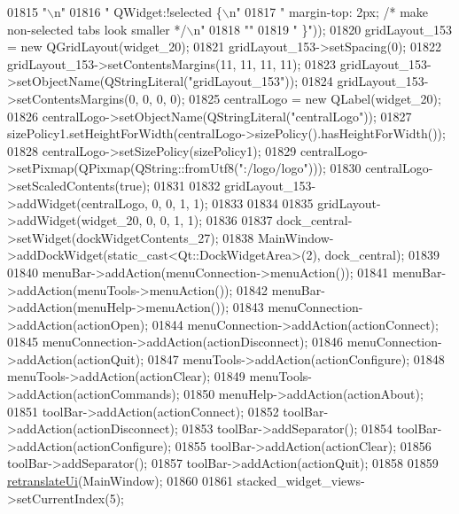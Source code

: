 \begin{DoxyCode}
01815 \textcolor{stringliteral}{"\(\backslash\)n"}
01816 \textcolor{stringliteral}{" QWidget:!selected \{\(\backslash\)n"}
01817 \textcolor{stringliteral}{"     margin-top: 2px; /* make non-selected tabs look smaller */\(\backslash\)n"}
01818 \textcolor{stringliteral}{""}
01819                         \textcolor{stringliteral}{" \}"}));
01820         gridLayout\_153 = \textcolor{keyword}{new} QGridLayout(widget\_20);
01821         gridLayout\_153->setSpacing(0);
01822         gridLayout\_153->setContentsMargins(11, 11, 11, 11);
01823         gridLayout\_153->setObjectName(QStringLiteral(\textcolor{stringliteral}{"gridLayout\_153"}));
01824         gridLayout\_153->setContentsMargins(0, 0, 0, 0);
01825         centralLogo = \textcolor{keyword}{new} QLabel(widget\_20);
01826         centralLogo->setObjectName(QStringLiteral(\textcolor{stringliteral}{"centralLogo"}));
01827         sizePolicy1.setHeightForWidth(centralLogo->sizePolicy().hasHeightForWidth());
01828         centralLogo->setSizePolicy(sizePolicy1);
01829         centralLogo->setPixmap(QPixmap(QString::fromUtf8(\textcolor{stringliteral}{":/logo/logo"})));
01830         centralLogo->setScaledContents(\textcolor{keyword}{true});
01831 
01832         gridLayout\_153->addWidget(centralLogo, 0, 0, 1, 1);
01833 
01834 
01835         gridLayout->addWidget(widget\_20, 0, 0, 1, 1);
01836 
01837         dock\_central->setWidget(dockWidgetContents\_27);
01838         MainWindow->addDockWidget(static\_cast<Qt::DockWidgetArea>(2), dock\_central);
01839 
01840         menuBar->addAction(menuConnection->menuAction());
01841         menuBar->addAction(menuTools->menuAction());
01842         menuBar->addAction(menuHelp->menuAction());
01843         menuConnection->addAction(actionOpen);
01844         menuConnection->addAction(actionConnect);
01845         menuConnection->addAction(actionDisconnect);
01846         menuConnection->addAction(actionQuit);
01847         menuTools->addAction(actionConfigure);
01848         menuTools->addAction(actionClear);
01849         menuTools->addAction(actionCommands);
01850         menuHelp->addAction(actionAbout);
01851         toolBar->addAction(actionConnect);
01852         toolBar->addAction(actionDisconnect);
01853         toolBar->addSeparator();
01854         toolBar->addAction(actionConfigure);
01855         toolBar->addAction(actionClear);
01856         toolBar->addSeparator();
01857         toolBar->addAction(actionQuit);
01858 
01859         \hyperlink{a00080_a097dd160c3534a204904cb374412c618}{retranslateUi}(MainWindow);
01860 
01861         stacked\_widget\_views->setCurrentIndex(5);

\end{DoxyCode}
